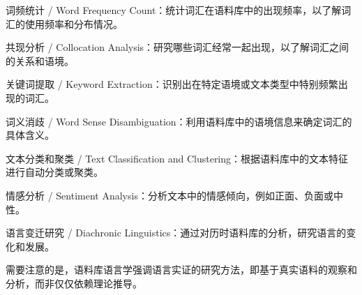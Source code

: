 \documentclass[]{book}
\begin{document}
词频统计 / Word Frequency Count：统计词汇在语料库中的出现频率，以了解词汇的使用频率和分布情况。

共现分析 / Collocation Analysis：研究哪些词汇经常一起出现，以了解词汇之间的关系和语境。

关键词提取 / Keyword Extraction：识别出在特定语境或文本类型中特别频繁出现的词汇。

词义消歧 / Word Sense Disambiguation：利用语料库中的语境信息来确定词汇的具体含义。

文本分类和聚类 / Text Classification and Clustering：根据语料库中的文本特征进行自动分类或聚类。

情感分析 / Sentiment Analysis：分析文本中的情感倾向，例如正面、负面或中性。

语言变迁研究 / Diachronic Linguistics：通过对历时语料库的分析，研究语言的变化和发展。

需要注意的是，语料库语言学强调语言实证的研究方法，即基于真实语料的观察和分析，而非仅仅依赖理论推导。
\end{document}
